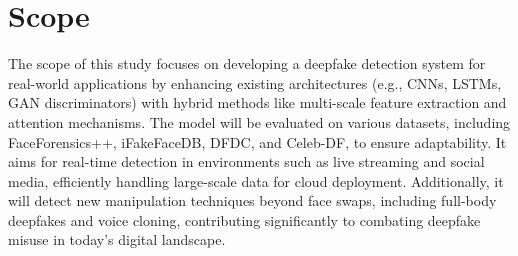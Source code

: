 \section{Scope}
The scope of this study focuses on developing a deepfake detection system for real-world applications by enhancing existing architectures (e.g., CNNs, LSTMs, GAN discriminators) with hybrid methods like multi-scale feature extraction and attention mechanisms. The model will be evaluated on various datasets, including FaceForensics++, iFakeFaceDB, DFDC, and Celeb-DF, to ensure adaptability. It aims for real-time detection in environments such as live streaming and social media, efficiently handling large-scale data for cloud deployment. Additionally, it will detect new manipulation techniques beyond face swaps, including full-body deepfakes and voice cloning, contributing significantly to combating deepfake misuse in today’s digital landscape.
